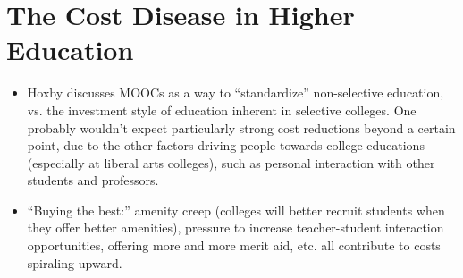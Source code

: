 \documentclass[10pt]{extarticle}
\begin{document}
  \section{The Cost Disease in Higher Education}%
  \begin{itemize}
    \item Hoxby discusses MOOCs as a way to ``standardize'' non-selective education, vs. the investment style of education inherent in selective colleges. One probably wouldn't expect particularly strong cost reductions beyond a certain point, due to the other factors driving people towards college educations (especially at liberal arts colleges), such as personal interaction with other students and professors.
    \item ``Buying the best:'' amenity creep (colleges will better recruit students when they offer better amenities), pressure to increase teacher-student interaction opportunities, offering more and more merit aid, etc. all contribute to costs spiraling upward.\\


\end{itemize}
\end{document}
